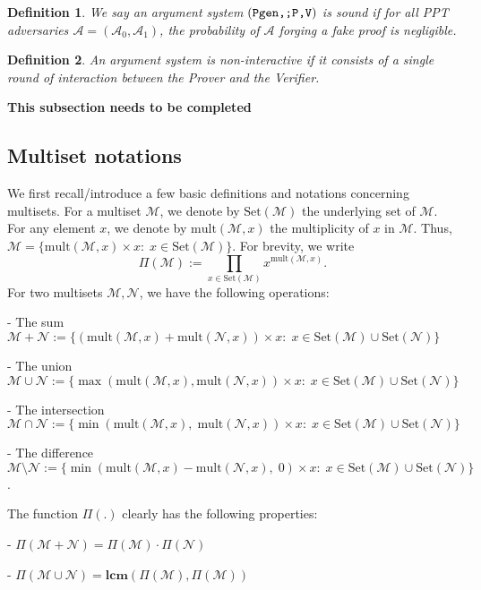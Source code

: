 \documentclass[11pt, lettersize, notitlepage, leqno, footskip=0.6cm]{article}
\newcommand{\pl}{\prod\limits}
\newcommand{\sett}{\mr{Set}}
\newcommand{\mult}{\mr{mult}}
\newcommand{\mul}{\mr{mult}}
\newcommand{\mc}{\mathcal}
\newcommand{\mbf}{\mathbf}
\newcommand{\mr}{\mathrm}
\newcommand{\sm}{\setminus}
\newcommand{\vs}{\vspace{-0.15cm}}
\newcommand{\noin}{\noindent}
\newcommand{\LCM}{\mbf{lcm}}
\newtheorem{Def}{Definition}[section]
\numberwithin{equation}{section}
\begin{document}
\begin{Def} \normalfont We say an argument system $\protect{(\verb|Pgen,;P,V|)}$ is \textit{sound} if for all PPT adversaries $\mc{A} = (\mc{A}_0, \mc{A}_1)$, the probability of $\mc{A}$ forging a fake proof is negligible.\end{Def}

\begin{Def} \normalfont An argument system is \textit{non-interactive} if it consists of a single round of interaction between the Prover and the Verifier.\end{Def}

\noin \textbf{This subsection needs to be completed}

\subsection{\fontsize{11}{11}\selectfont Multiset notations}


We first recall/introduce a few basic definitions and notations concerning multisets. For a multiset $\mc{M}$, we denote by $\sett(\mc{M})$ the underlying set of $\mc{M}$. For any element $x$, we denote by $\mul(\mc{M},x)$ the multiplicity of $x$ in $\mc{M}$. Thus, $\mc{M} = \{ \mult(\mc{M},x)\times x: \; x\in \sett(\mc{M})\}$. For brevity, we write \vs $$\Pi(\mc{M}):= \pl_{x\in \sett(\mc{M})} x^{\mult(\mc{M},x)}.$$ For two multisets $\mc{M}, \mc{N}$, we have the following operations:\vspace{0.1cm}

\noin - The sum $\mc{M}+\mc{N} := \{(\mul(\mc{M},x)+\mul(\mc{N},x))\times x:\;x\in \sett(\mc{M})\cup\sett(\mc{N}) \}$

\noin - The union $\mc{M}\cup \mc{N} := \{\max(\mul(\mc{M},x),\mul(\mc{N},x))\times x:\;x\in \sett(\mc{M})\cup\sett(\mc{N})\}$

\noin - The intersection $\mc{M}\cap \mc{N} := \{\min(\mul(\mc{M},x),\;\mul(\mc{N},x))\times x:\;x\in \sett(\mc{M})\cup\sett(\mc{N})\}$

\noin - The difference $\mc{M}\sm \mc{N} := \{\min(\mul(\mc{M},x)-\mul(\mc{N},x),\; 0)\times x:\;x\in \sett(\mc{M})\cup\sett(\mc{N})\}$.\vspace{0.1cm}

\noin The function $\Pi(.)$ clearly has the following properties:

\noin- $\Pi(\mc{M}+\mc{N})= \Pi(\mc{M})\cdot\Pi(\mc{N})$

\noin - $\Pi(\mc{M}\cup \mc{N}) = \LCM(\Pi(\mc{M}), \Pi(\mc{M}))$
\end{document}
